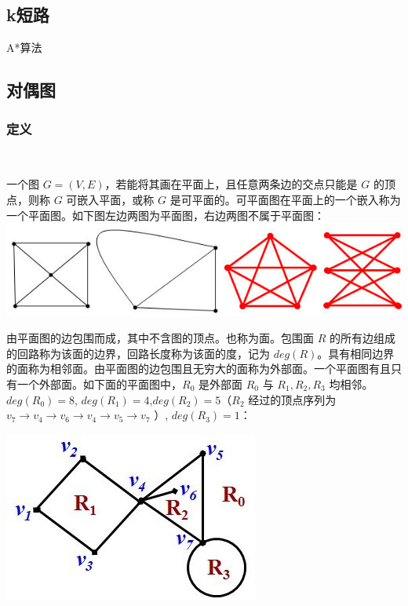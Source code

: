 	\subsection{k短路}
	{\large A*算法}\\
	
	\newpage
	\subsection{对偶图}
	\subsubsection{定义}~

	 一个图 $G=(V,E)$，若能将其画在平面上，且任意两条边的交点只能是 $G$ 的顶点，则称 $G$ 可嵌入平面，或称 $G$ 是可平面的。可平面图在平面上的一个嵌入称为一个平面图。如下图左边两图为平面图，右边两图不属于平面图：\\
	 \includegraphics[scale=0.75]{./source/img1.jpeg}
	 
	 由平面图的边包围而成，其中不含图的顶点。也称为面。包围面 $R$ 的所有边组成的回路称为该面的边界，回路长度称为该面的度，记为 $deg(R)$。具有相同边界的面称为相邻面。由平面图的边包围且无穷大的面称为外部面。一个平面图有且只有一个外部面。如下面的平面图中，$R_0$ 是外部面 $R_0$ 与 $R_1,R_2,R_3$ 均相邻。$deg(R_0)=8$, $deg(R_1)=4$,$deg(R_2)=5$（$R_2$ 经过的顶点序列为 $v_7\rightarrow v_4\rightarrow v_6\rightarrow v_4\rightarrow v_5\rightarrow v_7$ ）, $deg(R_3)=1$：\\
	 \begin{center}
	 	\includegraphics[scale=0.5]{./source/img2.jpeg}
	 \end{center}
	 
